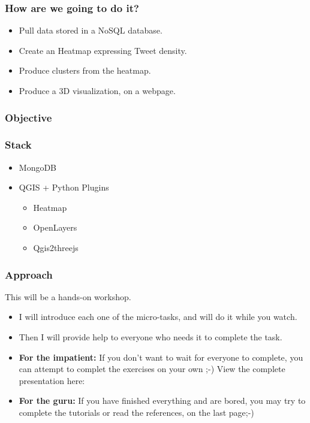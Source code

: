 \documentclass[hyperref={pdfpagelabels=true}]{beamer}
\begin{document}
\begin{frame}
\frametitle{How are we going to do it?}

\begin{itemize}
  \item<2->Pull data stored in a NoSQL database.
  \item<3->Create an Heatmap expressing Tweet density.
  \item<4->Produce clusters from the heatmap.
  \item<5->Produce a 3D visualization, on a webpage.  
\end{itemize}

\end{frame}

\begin{frame}
\frametitle{Objective}

\end{frame}

\begin{frame}
\frametitle{Stack}
\begin{itemize}
  \item MongoDB
  \item QGIS + Python Plugins
  \begin{itemize}
    \item<2-> Heatmap
    \item<3-> OpenLayers
    \item<4-> Qgis2threejs    
  \end{itemize}    
\end{itemize}

\end{frame}

\begin{frame}
\frametitle{Approach}
This will be a hands-on workshop.
\begin{itemize}
  \item<2-> I will introduce each one of the micro-tasks, and will do it while you watch.
  \item<3-> Then I will provide help to everyone who needs it to complete the task.
  \item<4-> \textbf{For the impatient:} If you don't want to wait for everyone to complete, you can attempt to complet the exercises on your own ;-) View the complete presentation here: %
  \item<5-> \textbf{For the guru:} If you have finished everything and are bored, you may try to complete the tutorials or read the references, on the last page;-)
\end{itemize}
\end{frame}
\end{document}
